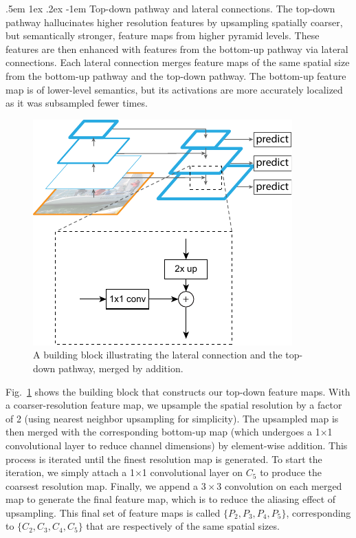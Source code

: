 \documentclass[10pt,twocolumn,letterpaper]{article}
\makeatletter
\renewcommand\paragraph{\@startsection{paragraph}{4}{\z@}%
  {.5em \@plus1ex \@minus.2ex}%
  {-1em}%
  {\normalfont\normalsize\bfseries}}
\makeatother
\begin{document}
\paragraph{Top-down pathway and lateral connections.}
The top-down pathway hallucinates higher resolution features by upsampling spatially coarser, but semantically stronger, feature maps from higher pyramid levels.
These features are then enhanced with features from the bottom-up pathway via lateral connections.
Each lateral connection merges feature maps of the same spatial size from the bottom-up pathway and the top-down pathway.
The bottom-up feature map is of lower-level semantics, but its activations are more accurately localized as it was subsampled fewer times.

\begin{figure}[t]
\center
\includegraphics[width=0.6\linewidth]{ai/block}
\caption{A building block illustrating the lateral connection and the top-down pathway, merged by addition.}
\label{fig:block}
\end{figure}

Fig.~\ref{fig:block} shows the building block that constructs our top-down feature maps.
With a coarser-resolution feature map, we upsample the spatial resolution by a factor of 2 (using nearest neighbor upsampling for simplicity).
The upsampled map is then merged with the corresponding bottom-up map (which undergoes a 1$\times$1 convolutional layer to reduce channel dimensions) by element-wise addition.
This process is iterated until the finest resolution map is generated.
To start the iteration, we simply attach a 1$\times$1 convolutional layer on $C_5$ to produce the coarsest resolution map.
Finally, we append a $3\times 3$ convolution on each merged map to generate the final feature map, which is to reduce the aliasing effect of upsampling.
This final set of feature maps is called $\{P_2, P_3, P_4, P_5\}$, corresponding to $\{C_2, C_3, C_4, C_5\}$ that are respectively of the same spatial sizes.
\end{document}
